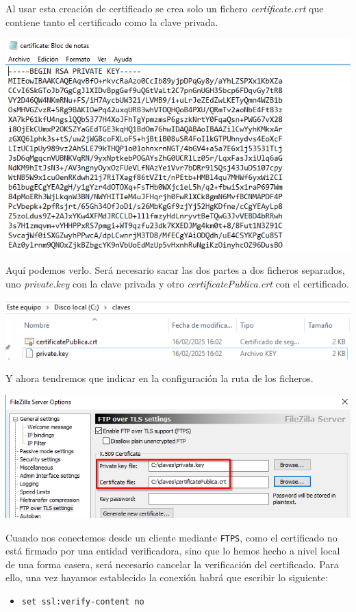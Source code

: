 \documentclass[11pt]{article}
\begin{document}
Al usar esta creación de certificado se crea solo un fichero \emph{certificate.crt} que contiene tanto el certificado como la clave privada.

\begin{center}
\includegraphics[width=.9\linewidth]{./media/9.png}
\end{center}

Aquí podemos verlo. Será necesario sacar las dos partes a dos ficheros separados, uno \emph{private.key} con la clave privada y otro \emph{certificatePublica.crt} con el certificado.

\begin{center}
\includegraphics[width=.9\linewidth]{./media/10.png}
\end{center}

Y ahora tendremos que indicar en la configuración la ruta de los ficheros.

\begin{center}
\includegraphics[width=.9\linewidth]{./media/11.png}
\end{center}

Cuando nos conectemos desde un cliente mediante \texttt{FTPS}, como el certificado no está firmado por una entidad verificadora, sino que lo hemos hecho a nivel local de una forma casera, será
necesario cancelar la verificación del certificado. Para ello, una vez hayamos establecido la conexión habrá que escribir lo siguiente:
\begin{itemize}
\item \texttt{set ssl:verify-content no}
\end{itemize}
\end{document}
